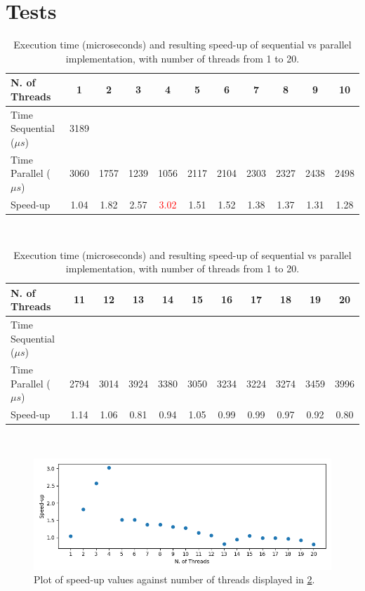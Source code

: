 \documentclass[10pt,twocolumn,letterpaper]{article}
\begin{document}
\section{Tests}
\begin{table}[]
	\centering
	\begin{tabular}{|l|c|c|c|c|c|c|c|c|c|c|}
		\hline
		N. of Threads        & 1    & 2    & 3    & 4    & 5    & 6    & 7    & 8    & 9    & 10   \\ \hline
		Time Sequential ($\mu s$) & 3189 &      &      &      &      &      &      &      &      &      \\ \hline
		Time Parallel ($\mu s$)   & 3060 & 1757 & 1239 & 1056 & 2117 & 2104 & 2303 & 2327 & 2438 & 2498 \\ \hline
		Speed-up             & 1.04 & 1.82 & 2.57 & \textcolor{red}{3.02} & 1.51 & 1.52 & 1.38 & 1.37 & 1.31 & 1.28 \\ \hline
	\end{tabular}\\
	\bigskip
	\begin{tabular}{|l|c|c|c|c|c|c|c|c|c|c|}
		\hline
		N. of Threads        & 11   & 12   & 13   & 14   & 15   & 16   & 17   & 18   & 19   & 20   \\ \hline
		Time Sequential ($\mu s$) &      &      &      &      &      &      &      &      &      &      \\ \hline
		Time Parallel ($\mu s$)   & 2794 & 3014 & 3924 & 3380 & 3050 & 3234 & 3224 & 3274 & 3459 & 3996 \\ \hline
		Speed-up             & 1.14 & 1.06 & 0.81 & 0.94 & 1.05 & 0.99 & 0.99 & 0.97 & 0.92 & 0.80 \\ \hline
	\end{tabular}\\
	\bigskip
	\caption{Execution time (microseconds) and resulting speed-up of sequential vs parallel implementation, with number of threads from 1 to 20.}
	\label{table:speedup}
\end{table}
\begin{figure}
	\begin{center}
		\includegraphics[width=\textwidth]{img/speedup.png}
	\end{center}
	\caption{Plot of speed-up values against number of threads displayed in \cref{table:speedup}.}
	\label{fig:speedup}
\end{figure}
\end{document}

